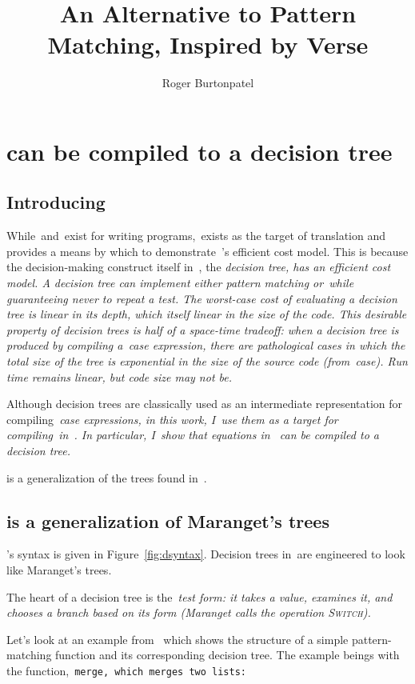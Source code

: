 \documentclass[manuscript,screen, 12pt, nonacm]{acmart}
\title{An Alternative to Pattern Matching, Inspired by Verse}
\author{Roger Burtonpatel}
\affiliation{%
\institution{Tufts University}
\streetaddress{419 Boston Ave}
  \city{Medford}
  \state{Massachusetts}
  \country{USA}
  \postcode{02155}
  }
\begin{document}
  

\section{\VMinus can be compiled to a decision tree}
\label{vminustod}

\subsection{Introducing~\D}
\label{d}

While~\PPlus and~\VMinus exist for writing programs,~\D exists as the target of
translation and provides a means by which to demonstrate~\VMinus's efficient
cost model. This is because the decision-making construct itself in~\D, the
\it{decision tree}, has an efficient cost model. A decision tree can implement
either pattern matching or~\iffibf while guaranteeing never to repeat a test.
The worst-case cost of evaluating a decision tree is linear in its depth, which
itself linear in the size of the code. This desirable property of decision trees
is half of a space-time tradeoff: when a decision tree is produced by compiling
a~\it{case} expression, there are pathological cases in which the total size of
the tree is exponential in the size of the source code (from~\it{case}). Run
time remains linear, but code size may not be. 

Although decision trees are classically used as an intermediate representation
for compiling~\it{case} expressions, in this work, I~use them as a target for
compiling~\iffibf in~\VMinus. In particular, I~show that equations in~\VMinus
can be compiled to a decision tree. 

\D is a generalization of the trees found in~\citet{maranget}. 

\subsection{\D is a generalization of Maranget's trees} 

\D's syntax is given in Figure~\ref{fig:dsyntax}. Decision trees in~\D are
engineered to look like Maranget's trees. 
  
      
  The heart of a decision tree is the~\it{test} form: it takes a value, examines
  it, and chooses a branch based on its form (Maranget calls the operation
  \textsc{Switch}). 

  Let's look at an example from~\citet{maranget} which shows the structure of a
  simple pattern-matching function and its corresponding decision tree. The
  example beings with the function,~\tt{merge}, which merges two lists: 
\end{document}

